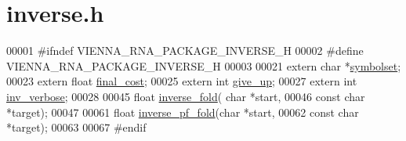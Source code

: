 \hypertarget{inverse_8h_source}{}\section{inverse.\+h}
\label{inverse_8h_source}

\begin{DoxyCode}
00001 \textcolor{preprocessor}{#ifndef VIENNA\_RNA\_PACKAGE\_INVERSE\_H}
00002 \textcolor{preprocessor}{#define VIENNA\_RNA\_PACKAGE\_INVERSE\_H}
00003 
00021 \textcolor{keyword}{extern} \textcolor{keywordtype}{char} *\hyperlink{group__inverse__fold_ga8f791e7740a5a28b9f6fafb4e60301d9}{symbolset};
00023 \textcolor{keyword}{extern}  \textcolor{keywordtype}{float} \hyperlink{group__inverse__fold_ga7f17d3b169af048d32bb185039a9c09c}{final\_cost};
00025 \textcolor{keyword}{extern}  \textcolor{keywordtype}{int}   \hyperlink{group__inverse__fold_ga7ec4ba51f86e1717a1e174264e4a75ce}{give\_up};
00027 \textcolor{keyword}{extern}  \textcolor{keywordtype}{int}   \hyperlink{group__inverse__fold_gafcfc65fba01b9cca5946726ed9057a63}{inv\_verbose};
00028 
00045 \textcolor{keywordtype}{float} \hyperlink{group__inverse__fold_ga7af026de55d4babad879f2c92559cbbc}{inverse\_fold}( \textcolor{keywordtype}{char} *start,
00046                     \textcolor{keyword}{const} \textcolor{keywordtype}{char} *target);
00047 
00061 \textcolor{keywordtype}{float} \hyperlink{group__inverse__fold_gaeef52ecbf2a2450ad585a344f9826806}{inverse\_pf\_fold}(\textcolor{keywordtype}{char} *start,
00062                       \textcolor{keyword}{const} \textcolor{keywordtype}{char} *target);
00063 
00067 \textcolor{preprocessor}{#endif}
\end{DoxyCode}
